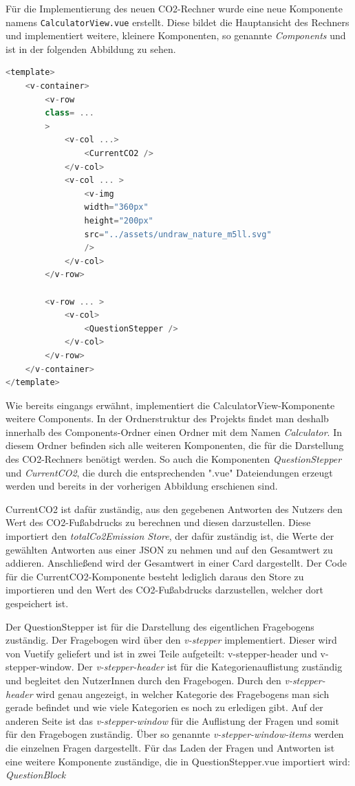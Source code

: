 Für die Implementierung des neuen CO2-Rechner wurde eine neue Komponente namens \texttt{CalculatorView.vue} erstellt.
Diese bildet die Hauptansicht des Rechners und implementiert weitere, kleinere Komponenten, so genannte \textit{Components} und ist in der folgenden Abbildung zu sehen.

\begin{lstlisting}[language={JavaScript}, caption={Aufbau der CalculatorView.vue Komponente}]
<template>
    <v-container>
        <v-row
        class= ...
        >
            <v-col ...>
                <CurrentCO2 />
            </v-col>
            <v-col ... >
                <v-img
                width="360px"
                height="200px"
                src="../assets/undraw_nature_m5ll.svg"
                />
            </v-col>
        </v-row>

        <v-row ... >
            <v-col>
                <QuestionStepper />
            </v-col>
        </v-row>
    </v-container>
</template>
\end{lstlisting}

Wie bereits eingangs erwähnt, implementiert die CalculatorView-Komponente weitere Components.
In der Ordnerstruktur des Projekts findet man deshalb innerhalb des Components-Ordner einen Ordner mit dem Namen \textit{Calculator}.
In diesem Ordner befinden sich alle weiteren Komponenten, die für die Darstellung des CO2-Rechners benötigt werden.
So auch die Komponenten \textit{QuestionStepper} und \textit{CurrentCO2}, die durch die entsprechenden ".vue" Dateiendungen erzeugt werden und bereits in der vorherigen Abbildung erschienen sind.

CurrentCO2 ist dafür zuständig, aus den gegebenen Antworten des Nutzers den Wert des CO2-Fußabdrucks zu berechnen und diesen darzustellen.
Diese importiert den \textit{totalCo2Emission Store}, der dafür zuständig ist, die Werte der gewählten Antworten aus einer \acs{JSON} zu nehmen und auf den Gesamtwert zu addieren.
Anschließend wird der Gesamtwert in einer Card dargestellt.
Der Code für die CurrentCO2-Komponente besteht lediglich daraus den Store zu importieren und den Wert des CO2-Fußabdrucks darzustellen, welcher dort gespeichert ist.

Der QuestionStepper ist für die Darstellung des eigentlichen Fragebogens zuständig.
Der Fragebogen wird über den \textit{v-stepper} implementiert.
Dieser wird von Vuetify geliefert und ist in zwei Teile aufgeteilt: v-stepper-header und v-stepper-window.
Der \textit{v-stepper-header} ist für die Kategorienauflistung zuständig und begleitet den NutzerInnen durch den Fragebogen.
Durch den \textit{v-stepper-header} wird genau angezeigt, in welcher Kategorie des Fragebogens man sich gerade befindet und wie viele Kategorien es noch zu erledigen gibt.
Auf der anderen Seite ist das \textit{v-stepper-window} für die Auflistung der Fragen und somit für den Fragebogen zuständig.
Über so genannte \textit{v-stepper-window-items} werden die einzelnen Fragen dargestellt.
Für das Laden der Fragen und Antworten ist eine weitere Komponente zuständige, die in QuestionStepper.vue importiert wird: \textit{QuestionBlock}

